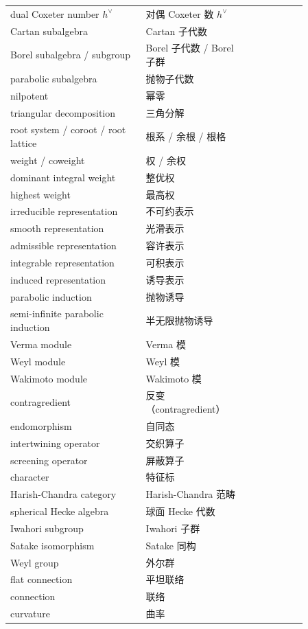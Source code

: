 \begin{longtable}{p{0.40\linewidth}p{0.28\linewidth}p{0.18\linewidth}}
dual Coxeter number $h^\vee$ & 对偶 Coxeter 数 $h^\vee$ &  \\
Cartan subalgebra & Cartan 子代数 &  \\
Borel subalgebra / subgroup & Borel 子代数 / Borel 子群 &  \\
parabolic subalgebra & 抛物子代数 &  \\
nilpotent & 幂零 &  \\
triangular decomposition & 三角分解 &  \\
root system / coroot / root lattice & 根系 / 余根 / 根格 &  \\
weight / coweight & 权 / 余权 &  \\
dominant integral weight & 整优权 &  \\
highest weight & 最高权 &  \\
irreducible representation & 不可约表示 &  \\
smooth representation & 光滑表示 &  \\
admissible representation & 容许表示 &  \\
integrable representation & 可积表示 &  \\
induced representation & 诱导表示 &  \\
parabolic induction & 抛物诱导 &  \\
semi-infinite parabolic induction & 半无限抛物诱导 &  \\
Verma module & Verma 模 &  \\
Weyl module & Weyl 模 &  \\
Wakimoto module & Wakimoto 模 &  \\
contragredient & 反变（contragredient） &  \\
endomorphism & 自同态 &  \\
intertwining operator & 交织算子 &  \\
screening operator & 屏蔽算子 &  \\
character & 特征标 &  \\
Harish-Chandra category & Harish-Chandra 范畴 &  \\
spherical Hecke algebra & 球面 Hecke 代数 &  \\
Iwahori subgroup & Iwahori 子群 &  \\
Satake isomorphism & Satake 同构 &  \\
Weyl group & 外尔群 &  \\
flat connection & 平坦联络 &  \\
connection & 联络 &  \\
curvature & 曲率 &  \\

\end{longtable}
